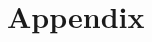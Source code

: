 \documentclass{article}\usepackage[]{graphicx}\usepackage[]{xcolor}
\begin{document}
\begin{multicols}{2}
\nocite{jsonlite}
\nocite{stringr}
\nocite{tidyverse}
\nocite{Essentia}
\nocite{Essentia2}
\nocite{Song}
\nocite{Shiny}
\nocite{LIWC}


\vspace{2em}
\begin{tiny}

\end{tiny}
\end{multicols}

\section{Appendix}
\end{document}
